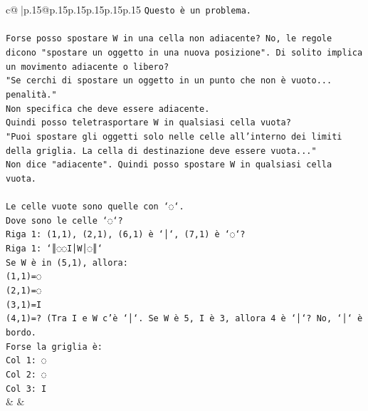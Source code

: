 \documentclass{article}
\begin{document}
{\begin{supertabular}{c@{$\;$}|p{.15\linewidth}@{}p{.15\linewidth}p{.15\linewidth}p{.15\linewidth}p{.15\linewidth}p{.15\linewidth}}
{{{\texttt{Questo è un problema.} \\
\\ 
\texttt{Forse posso spostare W in una cella non adiacente? No, le regole dicono "spostare un oggetto in una nuova posizione". Di solito implica un movimento adiacente o libero?} \\
\texttt{"Se cerchi di spostare un oggetto in un punto che non è vuoto... penalità."} \\
\texttt{Non specifica che deve essere adiacente.} \\
\texttt{Quindi posso teletrasportare W in qualsiasi cella vuota?} \\
\texttt{"Puoi spostare gli oggetti solo nelle celle all'interno dei limiti della griglia. La cella di destinazione deve essere vuota..."} \\
\texttt{Non dice "adiacente". Quindi posso spostare W in qualsiasi cella vuota.} \\
\\ 
\texttt{Le celle vuote sono quelle con `◌`.} \\
\texttt{Dove sono le celle `◌`?} \\
\texttt{Riga 1: (1,1), (2,1), (6,1) è `│`, (7,1) è `◌`?} \\
\texttt{Riga 1: `║◌◌I│W│◌║`} \\
\texttt{Se W è in (5,1), allora:} \\
\texttt{(1,1)=◌} \\
\texttt{(2,1)=◌} \\
\texttt{(3,1)=I} \\
\texttt{(4,1)=? (Tra I e W c'è `│`. Se W è 5, I è 3, allora 4 è `│`? No, `│` è bordo.} \\
\texttt{Forse la griglia è:} \\
\texttt{Col 1: ◌} \\
\texttt{Col 2: ◌} \\
\texttt{Col 3: I} \\
            }
        }
    }
    & & \\ \\


\end{supertabular}}
\end{document}
